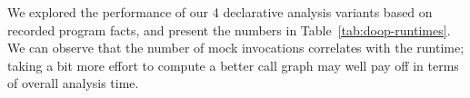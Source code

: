 
We explored the performance of our 4 declarative analysis variants based on recorded program facts, and present the numbers in Table~\ref{tab:doop-runtimes}. We can observe that the number of mock invocations correlates with the runtime; taking a bit more effort to compute a better call graph may well pay off in terms of overall analysis time.

 







